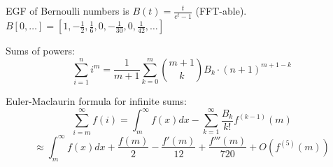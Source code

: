 EGF of Bernoulli numbers is $B(t)=\frac{t}{e^t-1}$ (FFT-able).
$B[0,\ldots] = [1, -\frac{1}{2}, \frac{1}{6}, 0, -\frac{1}{30}, 0, \frac{1}{42}, \ldots]$

Sums of powers:
\[ \sum_{i=1}^n i^m = \frac{1}{m+1} \sum_{k=0}^m \binom{m+1}{k} B_k \cdot (n+1)^{m+1-k} \]

Euler-Maclaurin formula for infinite sums:
\[ \sum_{i=m}^{\infty} f(i) = \int_m^\infty f(x) dx - \sum_{k=1}^\infty \frac{B_k}{k!}f^{(k-1)}(m) \]
\[ \approx \int_{m}^\infty f(x)dx + \frac{f(m)}{2} - \frac{f'(m)}{12} + \frac{f'''(m)}{720} + O(f^{(5)}(m)) \]